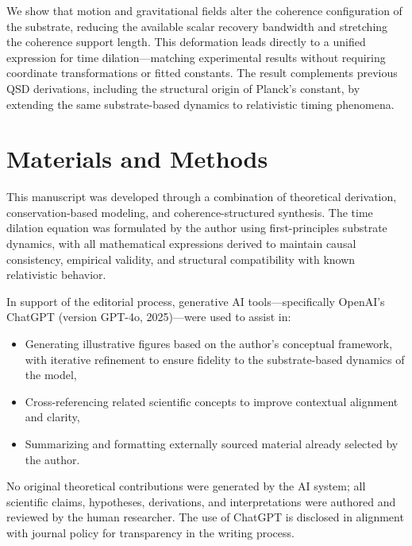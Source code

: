\documentclass[entropy,article,submit,pdftex,moreauthors]{Definitions/mdpi}
\begin{document}
We show that motion and gravitational fields alter the coherence configuration of the substrate, reducing the available scalar recovery bandwidth and stretching the coherence support length. This deformation leads directly to a unified expression for time dilation—matching experimental results without requiring coordinate transformations or fitted constants. The result complements previous QSD derivations, including the structural origin of Planck’s constant, by extending the same substrate-based dynamics to relativistic timing phenomena.




\section{Materials and Methods}

This manuscript was developed through a combination of theoretical derivation, conservation-based modeling, and coherence-structured synthesis. The time dilation equation was formulated by the author using first-principles substrate dynamics, with all mathematical expressions derived to maintain causal consistency, empirical validity, and structural compatibility with known relativistic behavior.

In support of the editorial process, generative AI tools—specifically OpenAI's ChatGPT (version GPT-4o, 2025)—were used to assist in:
\begin{itemize}
    \item Generating illustrative figures based on the author’s conceptual framework, with iterative refinement to ensure fidelity to the substrate-based dynamics of the model,
    \item Cross-referencing related scientific concepts to improve contextual alignment and clarity,
    \item Summarizing and formatting externally sourced material already selected by the author.
\end{itemize}

No original theoretical contributions were generated by the AI system; all scientific claims, hypotheses, derivations, and interpretations were authored and reviewed by the human researcher. The use of ChatGPT is disclosed in alignment with journal policy for transparency in the writing process.

\end{document}
